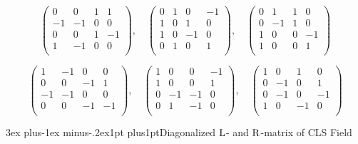 \documentclass[12pt]{article}
\makeatletter
\def\rL{{\rm L}}
\def\rR{{\rm R}}
\let\bm\relax
\newcommand{\bm}[1]{{\boldsymbol{#1}}}
\def\section{\@startsection{section}{1}{\z@}
        {3ex plus-1ex minus-.2ex}{1pt plus1pt}{\large\sf\bfseries\boldmath}}
\makeatother
\begin{document}
\begin{equation}
\left(
\begin{array}{cccc}
 0 & 0 & 1 & 1 \\
 -1 & -1 & 0 & 0 \\
 0 & 0 & 1 & -1 \\
 1 & -1 & 0 & 0 \\
\end{array}
\right)
,\quad
\left(
\begin{array}{cccc}
 0 & 1 & 0 & -1 \\
 1 & 0 & 1 & 0 \\
 1 & 0 & -1 & 0 \\
 0 & 1 & 0 & 1 \\
\end{array}
\right)
,\quad
\left(
\begin{array}{cccc}
 0 & 1 & 1 & 0 \\
 0 & -1 & 1 & 0 \\
 1 & 0 & 0 & -1 \\
 1 & 0 & 0 & 1 \\
\end{array}
\right)
\end{equation}

\begin{equation}
\left(
\begin{array}{cccc}
 1 & -1 & 0 & 0 \\
 0 & 0 & -1 & 1 \\
 -1 & -1 & 0 & 0 \\
 0 & 0 & -1 & -1 \\
\end{array}
\right)
,\quad
\left(
\begin{array}{cccc}
 1 & 0 & 0 & -1 \\
 1 & 0 & 0 & 1 \\
 0 & -1 & -1 & 0 \\
 0 & 1 & -1 & 0 \\
\end{array}
\right)
,\quad
\left(
\begin{array}{cccc}
 1 & 0 & 1 & 0 \\
 0 & -1 & 0 & 1 \\
 0 & -1 & 0 & -1 \\
 1 & 0 & -1 & 0 \\
\end{array}
\right)
\end{equation}





\section{Diagonalized $\bm\rL$- and $\bm\rR$-matrix of CLS Field}
\end{document}
